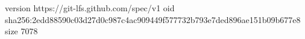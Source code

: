 version https://git-lfs.github.com/spec/v1
oid sha256:2edd88590c03d27d0c987c4ac909449f577732b793e7ded896ae151b09b677e8
size 7078
